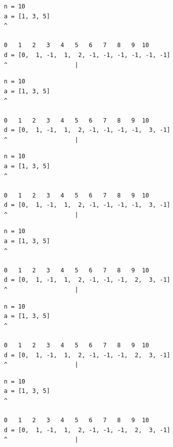 \begin{frame}[fragile]
\begin{verbatim}
n = 10
a = [1, 3, 5]
^

0   1   2   3   4   5   6   7   8   9  10
d = [0,  1, -1,  1,  2, -1, -1, -1, -1, -1, -1]
^                   |
\end{verbatim}
\end{frame}
\addtocounter{framenumber}{-1}

\begin{frame}[fragile]
\begin{verbatim}
n = 10
a = [1, 3, 5]
^

0   1   2   3   4   5   6   7   8   9  10
d = [0,  1, -1,  1,  2, -1, -1, -1, -1,  3, -1]
^                   |
\end{verbatim}
\end{frame}
\addtocounter{framenumber}{-1}

\begin{frame}[fragile]
\begin{verbatim}
n = 10
a = [1, 3, 5]
^

0   1   2   3   4   5   6   7   8   9  10
d = [0,  1, -1,  1,  2, -1, -1, -1, -1,  3, -1]
^                   |
\end{verbatim}
\end{frame}
\addtocounter{framenumber}{-1}

\begin{frame}[fragile]
\begin{verbatim}
n = 10
a = [1, 3, 5]
^

0   1   2   3   4   5   6   7   8   9  10
d = [0,  1, -1,  1,  2, -1, -1, -1,  2,  3, -1]
^                   |
\end{verbatim}
\end{frame}
\addtocounter{framenumber}{-1}

\begin{frame}[fragile]
\begin{verbatim}
n = 10
a = [1, 3, 5]
^

0   1   2   3   4   5   6   7   8   9  10
d = [0,  1, -1,  1,  2, -1, -1, -1,  2,  3, -1]
^                   |
\end{verbatim}
\end{frame}
\addtocounter{framenumber}{-1}

\begin{frame}[fragile]
\begin{verbatim}
n = 10
a = [1, 3, 5]
^

0   1   2   3   4   5   6   7   8   9  10
d = [0,  1, -1,  1,  2, -1, -1, -1,  2,  3, -1]
^                   |
\end{verbatim}
\end{frame}
\addtocounter{framenumber}{-1}

